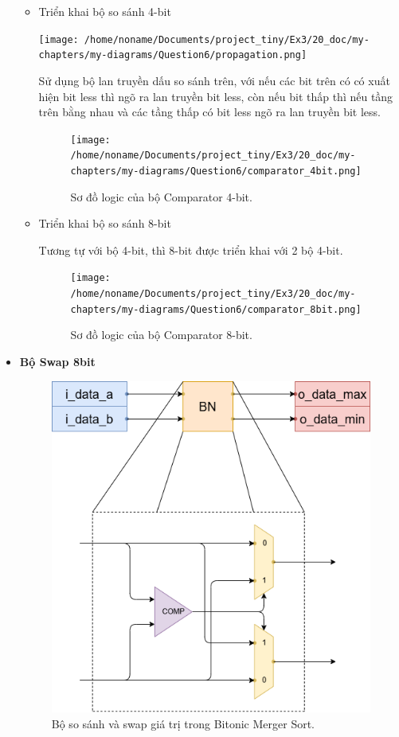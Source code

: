 \begin{itemize}[label=-]
\begin{itemize}[label=+]
		\item Triển khai bộ so sánh 4-bit
		
		\begin{minipage}{.4\linewidth}
			\texttt{[image: /home/noname/Documents/project\_tiny/Ex3/20\_doc/my-chapters/my-diagrams/Question6/propagation.png]}
		\end{minipage}
		\begin{minipage}{.4\linewidth}
			Sử dụng bộ lan truyền dấu so sánh trên, với nếu các bit trên có có xuất hiện bit less thì ngõ ra lan truyền bit less, còn nếu bit thấp thì nếu tầng trên bằng nhau và các tầng thấp có bit less ngõ ra lan truyền bit less.
		\end{minipage}
		
		\begin{figure}[H]
			\centering
			\texttt{[image: /home/noname/Documents/project\_tiny/Ex3/20\_doc/my-chapters/my-diagrams/Question6/comparator\_4bit.png]}
			\caption{Sơ đồ logic của bộ Comparator 4-bit.}
		\end{figure}
	
		\item Triển khai bộ so sánh 8-bit
		
		Tương tự với bộ 4-bit, thì 8-bit được triển khai với 2 bộ 4-bit.
		
		\begin{figure}[H]
			\centering
			\texttt{[image: /home/noname/Documents/project\_tiny/Ex3/20\_doc/my-chapters/my-diagrams/Question6/comparator\_8bit.png]}
			\caption{Sơ đồ logic của bộ Comparator 8-bit.}
		\end{figure}
	\end{itemize}

	\item \textbf{Bộ Swap 8bit}
	
	\begin{figure}[H]
		\centering
		\includegraphics[width=.4\linewidth]{./my-chapters/my-diagrams/Question6/Swap_and_compare.png}
		\caption{Bộ so sánh và swap giá trị trong Bitonic Merger Sort.}
	\end{figure}


\end{itemize}
